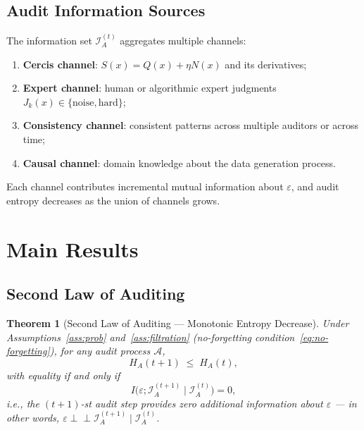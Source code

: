 \documentclass[12pt,a4paper]{article}
\newtheorem{theorem}{Theorem}[section]
\newcommand{\cI}{\mathcal{I}}
\newcommand{\cA}{\mathcal{A}}
\begin{document}
\subsection{Audit Information Sources}

The information set $\cI_A^{(t)}$ aggregates multiple channels:
\begin{enumerate}[label=(\roman*)]
    \item \textbf{Cercis channel}: $S(x)=Q(x)+\eta N(x)$ and its derivatives;
    \item \textbf{Expert channel}: human or algorithmic expert judgments $J_k(x)\in\{\mathrm{noise},\mathrm{hard}\}$;
    \item \textbf{Consistency channel}: consistent patterns across multiple auditors or across time;
    \item \textbf{Causal channel}: domain knowledge about the data generation process.
\end{enumerate}
Each channel contributes incremental mutual information about $\varepsilon$, and audit entropy decreases as the union of channels grows.

\section{Main Results}

\subsection{Second Law of Auditing}

\begin{theorem}[Second Law of Auditing --- Monotonic Entropy Decrease]
\label{thm:second-law}
Under Assumptions~\ref{ass:prob} and~\ref{ass:filtration} (no-forgetting condition~\eqref{eq:no-forgetting}), for any audit process $\cA$,
\begin{equation}\label{eq:second-law}
    H_A(t+1) \;\leq\; H_A(t),
\end{equation}
with equality if and only if
\[
I\bigl(\varepsilon; \cI_A^{(t+1)} \mid \cI_A^{(t)}\bigr) = 0,
\]
i.e., the $(t+1)$-st audit step provides zero additional information about $\varepsilon$ --- in other words, $\varepsilon \perp\!\!\!\perp \cI_A^{(t+1)} \mid \cI_A^{(t)}$.
\end{theorem}
\end{document}
